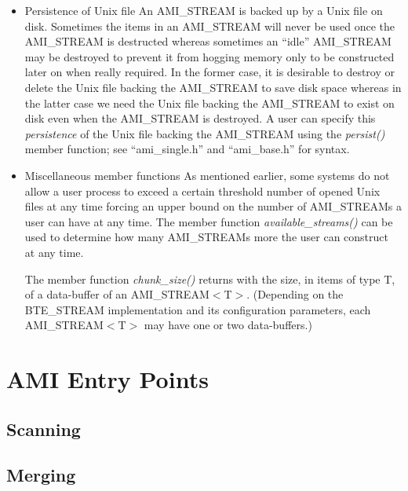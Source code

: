 \begin{itemize}
\item{Persistence of Unix file}
An AMI\_STREAM is backed up by a Unix file on disk. Sometimes the
items in an AMI\_STREAM will never be used  once the AMI\_STREAM is
destructed whereas sometimes an ``idle'' AMI\_STREAM may be destroyed 
to prevent it from hogging memory only to be constructed later on
when really required. In the former case, it is desirable to 
destroy or delete the Unix file backing the AMI\_STREAM to save
disk space whereas in the latter case we need the Unix file backing
the AMI\_STREAM to exist on disk even when the AMI\_STREAM is
destroyed. A user can specify this \emph{persistence} of the
Unix file backing the AMI\_STREAM using the \emph{persist()} member
function; see  ``ami\_single.h'' and ``ami\_base.h'' for syntax.


\item{Miscellaneous member functions}
As mentioned earlier, some systems do not allow a user process
to exceed a certain threshold number of opened Unix files at any time
forcing an upper bound on the number of AMI\_STREAMs a user can 
have at any time.  The member function \emph{available\_streams()} can
be used to determine how many AMI\_STREAMs more the user can construct
at any time.

The member function \emph{chunk\_size()} returns with the size,
in items of type T, of a data-buffer of an AMI\_STREAM$<$T$>$. (Depending
on the BTE\_STREAM implementation and its configuration parameters, each 
AMI\_STREAM$<$T$>$ may have one or two data-buffers.) 

\end{itemize}



\section{AMI Entry Points}
\label{sec:ref-entry}

\subsection{Scanning}
\label{sec:ref-imp-ami-scan}


\subsection{Merging}
\label{sec:ref-imp-ami-merge}


